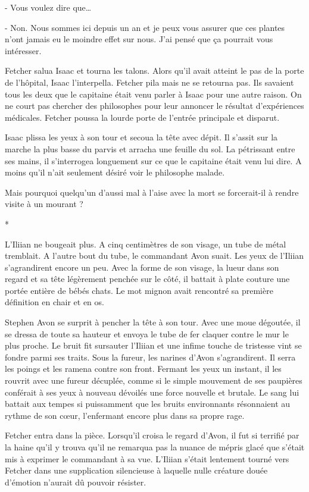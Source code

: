 \documentclass[12pt]{book}
\newcommand{\s}{\begin{center}
*
\end{center}
}
\begin{document}
-  Vous voulez dire que…

- Non. Nous sommes ici depuis un an et je peux vous assurer que ces plantes n'ont jamais eu le moindre effet sur nous. J’ai pensé que ça pourrait vous intéresser.



Fetcher salua Isaac et tourna les talons. Alors qu’il avait atteint le pas de la porte de l’hôpital, Isaac l’interpella. Fetcher pila mais ne se retourna pas. Ils savaient tous les deux que le capitaine était venu parler à Isaac pour une autre raison. On ne court pas chercher des philosophes pour leur annoncer le résultat d’expériences médicales. Fetcher poussa la lourde porte de l’entrée principale et disparut.


Isaac plissa les yeux à son tour et secoua la tête avec dépit. Il s’assit sur la marche la plus basse du parvis et arracha une feuille du sol. La pétrissant entre ses mains, il s’interrogea longuement sur ce que le capitaine était venu lui dire. A moins qu’il n’ait seulement désiré voir le philosophe malade.


Mais pourquoi quelqu’un d’aussi mal à l’aise avec la mort se forcerait-il à rendre visite à un mourant ?


\s

L’Iliian ne bougeait plus. A cinq centimètres de son visage, un tube de métal tremblait. A l’autre bout du tube, le commandant Avon suait. Les yeux de l’Iliian s’agrandirent encore un peu. Avec la forme de son visage, la lueur dans son regard et sa tête légèrement penchée sur le côté, il battait à plate couture une portée entière de bébés chats. Le mot mignon avait rencontré sa première définition en chair et en os.


Stephen Avon se surprit à pencher la tête à son tour. Avec une moue dégoutée, il se dressa de toute sa hauteur et envoya le tube de fer claquer contre le mur le plus proche. Le bruit fit sursauter l’Iliian et une infime touche de tristesse vint se fondre parmi ses traits. Sous la fureur, les narines d’Avon s’agrandirent. Il serra les poings et les ramena contre son front. Fermant les yeux un instant, il les rouvrit avec une fureur décuplée, comme si le simple mouvement de ses paupières conférait à ses yeux à nouveau dévoilés une force nouvelle et brutale. Le sang lui battait aux tempes si puissamment que les bruits environnants résonnaient au rythme de son cœur, l’enfermant encore plus dans sa propre rage.


Fetcher entra dans la pièce. Lorsqu’il croisa le regard d’Avon, il fut si terrifié par la haine qu'il y trouva qu’il ne remarqua pas la nuance de mépris glacé que s’était mis à exprimer le commandant à sa vue. L’Iliian s’était lentement tourné vers Fetcher dans une supplication silencieuse à laquelle nulle créature douée d’émotion n’aurait dû pouvoir résister.
\end{document}
